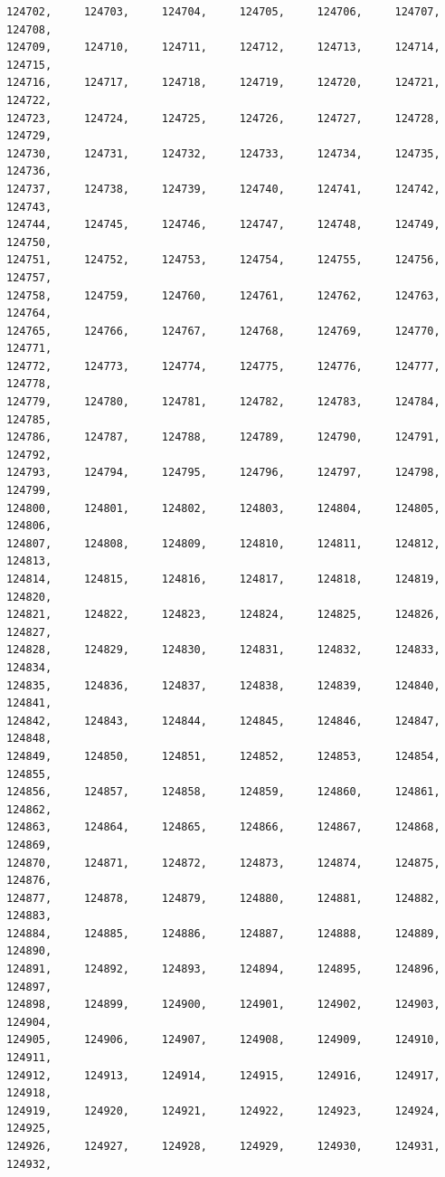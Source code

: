 \documentclass[a4paper,11pt]{report}
\begin{document}
\begin{verbatim}
124702,     124703,     124704,     124705,     124706,     124707,     124708,
124709,     124710,     124711,     124712,     124713,     124714,     124715,
124716,     124717,     124718,     124719,     124720,     124721,     124722,
124723,     124724,     124725,     124726,     124727,     124728,     124729,
124730,     124731,     124732,     124733,     124734,     124735,     124736,
124737,     124738,     124739,     124740,     124741,     124742,     124743,
124744,     124745,     124746,     124747,     124748,     124749,     124750,
124751,     124752,     124753,     124754,     124755,     124756,     124757,
124758,     124759,     124760,     124761,     124762,     124763,     124764,
124765,     124766,     124767,     124768,     124769,     124770,     124771,
124772,     124773,     124774,     124775,     124776,     124777,     124778,
124779,     124780,     124781,     124782,     124783,     124784,     124785,
124786,     124787,     124788,     124789,     124790,     124791,     124792,
124793,     124794,     124795,     124796,     124797,     124798,     124799,
124800,     124801,     124802,     124803,     124804,     124805,     124806,
124807,     124808,     124809,     124810,     124811,     124812,     124813,
124814,     124815,     124816,     124817,     124818,     124819,     124820,
124821,     124822,     124823,     124824,     124825,     124826,     124827,
124828,     124829,     124830,     124831,     124832,     124833,     124834,
124835,     124836,     124837,     124838,     124839,     124840,     124841,
124842,     124843,     124844,     124845,     124846,     124847,     124848,
124849,     124850,     124851,     124852,     124853,     124854,     124855,
124856,     124857,     124858,     124859,     124860,     124861,     124862,
124863,     124864,     124865,     124866,     124867,     124868,     124869,
124870,     124871,     124872,     124873,     124874,     124875,     124876,
124877,     124878,     124879,     124880,     124881,     124882,     124883,
124884,     124885,     124886,     124887,     124888,     124889,     124890,
124891,     124892,     124893,     124894,     124895,     124896,     124897,
124898,     124899,     124900,     124901,     124902,     124903,     124904,
124905,     124906,     124907,     124908,     124909,     124910,     124911,
124912,     124913,     124914,     124915,     124916,     124917,     124918,
124919,     124920,     124921,     124922,     124923,     124924,     124925,
124926,     124927,     124928,     124929,     124930,     124931,     124932,

\end{verbatim}
\end{document}
